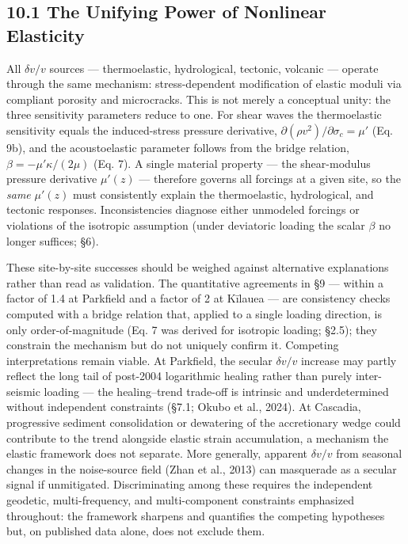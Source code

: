 \documentclass[draft]{agujournal2019}
\begin{document}
\subsection{10.1 The Unifying Power of Nonlinear
Elasticity}\label{the-unifying-power-of-nonlinear-elasticity}

All \(\delta v/v\) sources --- thermoelastic, hydrological, tectonic,
volcanic --- operate through the same mechanism: stress-dependent
modification of elastic moduli via compliant porosity and microcracks.
This is not merely a conceptual unity: the three sensitivity parameters
reduce to one. For shear waves the thermoelastic sensitivity equals the
induced-stress pressure derivative,
\(\partial(\rho v^2)/\partial\sigma_c = \mu'\) (Eq. 9b), and the
acoustoelastic parameter follows from the bridge relation,
\(\beta = -\mu'\kappa/(2\mu)\) (Eq. 7). A single material property ---
the shear-modulus pressure derivative \(\mu'(z)\) --- therefore governs
all forcings at a given site, so the \emph{same} \(\mu'(z)\) must
consistently explain the thermoelastic, hydrological, and tectonic
responses. Inconsistencies diagnose either unmodeled forcings or
violations of the isotropic assumption (under deviatoric loading the
scalar \(\beta\) no longer suffices; §6).

These site-by-site successes should be weighed against alternative
explanations rather than read as validation. The quantitative agreements
in §9 --- within a factor of 1.4 at Parkfield and a factor of 2 at
Kīlauea --- are consistency checks computed with a bridge relation that,
applied to a single loading direction, is only order-of-magnitude (Eq. 7
was derived for isotropic loading; §2.5); they constrain the mechanism
but do not uniquely confirm it. Competing interpretations remain viable.
At Parkfield, the secular \(\delta v/v\) increase may partly reflect the
long tail of post-2004 logarithmic healing rather than purely
inter-seismic loading --- the healing--trend trade-off is intrinsic and
underdetermined without independent constraints (§7.1; Okubo et al.,
2024). At Cascadia, progressive sediment consolidation or dewatering of
the accretionary wedge could contribute to the trend alongside elastic
strain accumulation, a mechanism the elastic framework does not
separate. More generally, apparent \(\delta v/v\) from seasonal changes
in the noise-source field (Zhan et al., 2013) can masquerade as a
secular signal if unmitigated. Discriminating among these requires the
independent geodetic, multi-frequency, and multi-component constraints
emphasized throughout: the framework sharpens and quantifies the
competing hypotheses but, on published data alone, does not exclude
them.
\end{document}
